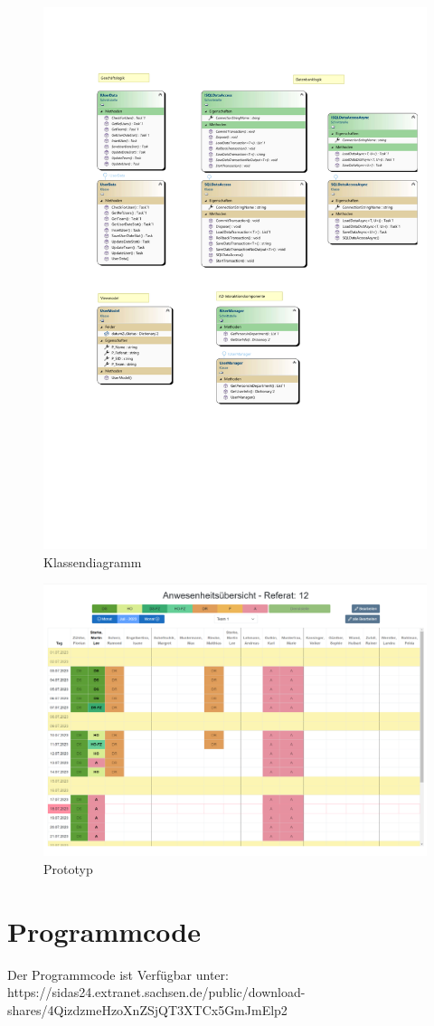 \begin{figure}[htb]
    \centering
    \includegraphics[width=1\textwidth,angle=0]{anhang/abb/Klassendiagramm.pdf}
    \caption[Klassendiagramm]{Klassendiagramm}
    \label{abb:Klassendiagramm}
\end{figure}

\begin{figure}[htb]
    \centering
    \includegraphics[angle=90, page=1,height=0.90\textheight, keepaspectratio]{abb/Prototyp_GUI.png}
    \caption[Benutzeroberfläche des Prototyps]{Prototyp}
    \label{abb:Prototyp}
\end{figure}

\section{Programmcode}
\label{Programmcode}
Der Programmcode ist Verfügbar unter:\\
https://sidas24.extranet.sachsen.de/public/download-shares/4QizdzmeHzoXnZSjQT3XTCx5GmJmElp2

